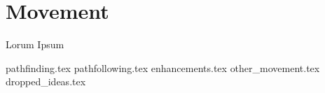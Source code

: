 \section{Movement}
Lorum Ipsum

{pathfinding.tex}
{pathfollowing.tex}
{enhancements.tex}
{other_movement.tex}
{dropped_ideas.tex}
